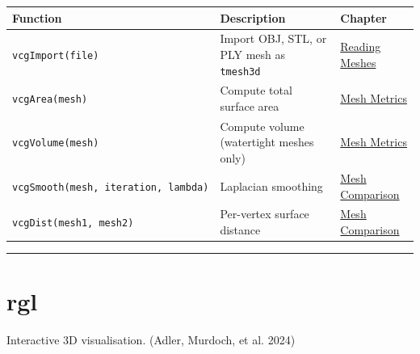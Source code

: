 \documentclass[
  11pt,
  letterpaper,
  DIV=11,
  numbers=noendperiod]{scrreprt}
\begin{document}
\begin{longtable}[]{@{}
  >{\raggedright\arraybackslash}p{}
  >{\raggedright\arraybackslash}p{}
  >{\raggedright\arraybackslash}p{}@{}}
\toprule\noalign{}
\begin{minipage}[b]{\linewidth}\raggedright
Function
\end{minipage} & \begin{minipage}[b]{\linewidth}\raggedright
Description
\end{minipage} & \begin{minipage}[b]{\linewidth}\raggedright
Chapter
\end{minipage} \\
\midrule\noalign{}
\endhead
\bottomrule\noalign{}
\endlastfoot
\texttt{vcgImport(file)} & Import OBJ, STL, or PLY mesh as
\texttt{tmesh3d} & \hyperref[reading-obj-and-stl-meshes]{Reading
Meshes} \\
\texttt{vcgArea(mesh)} & Compute total surface area &
\hyperref[mesh-metrics]{Mesh Metrics} \\
\texttt{vcgVolume(mesh)} & Compute volume (watertight meshes only) &
\hyperref[mesh-metrics]{Mesh Metrics} \\
\texttt{vcgSmooth(mesh,\ iteration,\ lambda)} & Laplacian smoothing &
\hyperref[mesh-comparison]{Mesh Comparison} \\
\texttt{vcgDist(mesh1,\ mesh2)} & Per-vertex surface distance &
\hyperref[mesh-comparison]{Mesh Comparison} \\
\end{longtable}

\begin{center}\rule{0.5\linewidth}{0.5pt}\end{center}

\section{rgl}\label{rgl}

Interactive 3D visualisation. (Adler, Murdoch, et al. 2024)
\end{document}
